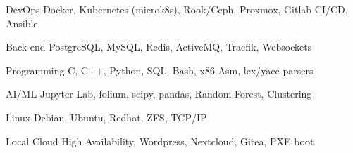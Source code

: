 
\begin{cvskills}


  \cvskill
    {DevOps} %
    {Docker, Kubernetes (microk8s), Rook/Ceph, Proxmox, Gitlab CI/CD, Ansible} %

  \cvskill
    {Back-end} %
    {PostgreSQL, MySQL, Redis, ActiveMQ, Traefik, Websockets} %


  \cvskill
    {Programming} %
    {C, C++, Python, SQL, Bash, x86 Asm, lex/yacc parsers} %

  \cvskill
    {AI/ML} %
    {Jupyter Lab, folium, scipy, pandas, Random Forest, Clustering} %


  \cvskill
    {Linux} %
    {Debian, Ubuntu, Redhat, ZFS, TCP/IP} %

  \cvskill
    {Local Cloud} %
    {High Availability, Wordpress, Nextcloud, Gitea, PXE boot} %

\end{cvskills}
